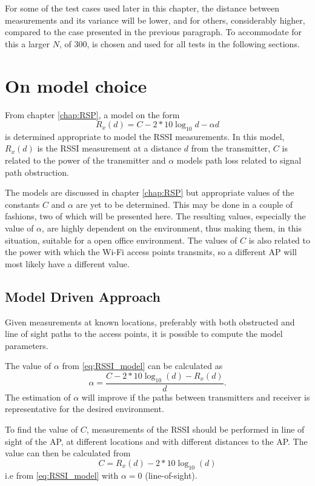 \documentclass{LTHthesis}
\begin{document}
For some of the test cases used later in this chapter, the distance between measurements and its variance will be lower, and for others, considerably higher, compared to the case presented in the previous paragraph. To accommodate for this a larger $N$, of 300, is chosen and used for all tests in the following sections.    
%
\section{On model choice}
%
From chapter \ref{chap:RSP}, a model on the form
%
\begin{equation}
R_x(d) = C - 2*10\log_{10}{d}-\alpha d
\label{eq:RSSI_model}
\end{equation}
%
is determined appropriate to model the RSSI measurements. In this model, $R_x(d)$ is the RSSI measurement at a distance $d$ from the transmitter, $C$ is related to the power of the transmitter and $\alpha$ models path loss related to signal path obstruction. 

The models are discussed in chapter \ref{chap:RSP} but appropriate values of the constants $C$ and $\alpha$ are yet to be determined. This may be done in a couple of fashions, two of which will be presented here. The resulting values, especially the value of $\alpha$, are highly dependent on the environment, thus making them, in this situation, suitable for a open office environment. The values of $C$ is also related to the power with which the Wi-Fi access points transmits, so a different AP will most likely have a different value.      

\subsection{Model Driven Approach}
%
Given measurements at known locations, preferably with both obstructed and line of sight paths to the access points, it is possible to compute the model parameters.

The value of $\alpha$ from \ref{eq:RSSI_model} can be calculated as
%
\begin{equation}
\alpha = \frac{C-2*10\log_{10}(d)-R_x(d)}{d}.
\end{equation}
%
The estimation of $\alpha$ will improve if the paths between transmitters and receiver is representative for the desired environment.  

To find the value of $C$, measurements of the RSSI should be performed in line of sight of the AP, at different locations and with different distances to the AP. The value can then be calculated from
%
\begin{equation}
C=R_x(d) - 2*10\log_{10}(d)
\end{equation}
% 
i.e from \ref{eq:RSSI_model} with $\alpha = 0$ (line-of-sight).
\end{document}
